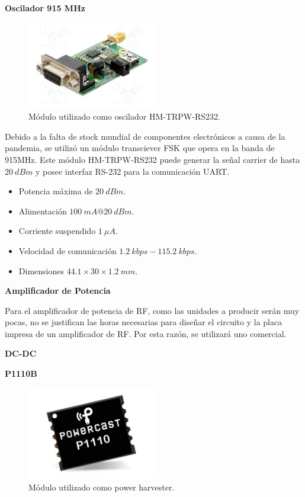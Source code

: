 \textbf{Oscilador 915 MHz}

\begin{figure}[H]
	\centering	
	\includegraphics[width=0.5\textwidth, page=8]{ImagenesIngenieria de Detalle/hmtrpwrs232}
	\caption{Módulo utilizado como oscilador HM-TRPW-RS232.}
	\label{fig:oscilador}
\end{figure}

Debido a la falta de stock mundial de componentes electrónicos a causa de la pandemia, se utilizó un módulo transciever FSK que opera en la banda de 915MHz. Este módulo HM-TRPW-RS232 puede generar la señal carrier de hasta $20 \ dBm$ y posee interfaz RS-232 para la comunicación UART.

\begin{itemize}
	\item Potencia máxima de $20 \ dBm$.
	\item Alimentación $100 \ mA@20 \ dBm$.
	\item Corriente suspendido $1 \ \mu A$.
	\item Velocidad de comunicación $1.2 \ kbps - 115.2 \ kbps$.
	\item Dimensiones $44.1 \times 30  \times 1.2 \ mm$.
\end{itemize}

\textbf{Amplificador de Potencia}

Para el amplificador de potencia de RF, como las unidades a producir serán muy pocas, no se justifican las horas necesarias para diseñar el circuito y la placa impresa de un amplificador de RF. Por esta razón, se utilizará uno comercial. 

\textbf{DC-DC}

\tbc

\textbf{P1110B}

\begin{figure}[H]
	\centering	
	\includegraphics[width=0.5\textwidth, page=8]{ImagenesIngenieria de Detalle/p1110b}
	\caption{Módulo utilizado como power harvester.}
	\label{fig:p1110b}
\end{figure}

